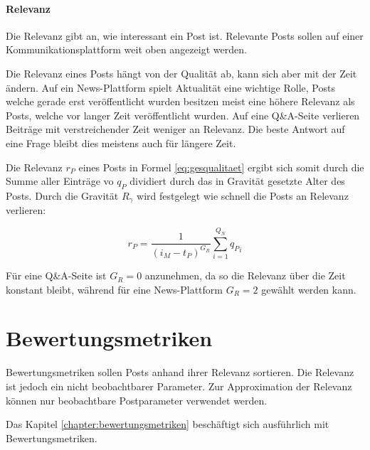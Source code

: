 \paragraph{Relevanz}

Die Relevanz gibt an, wie interessant ein Post ist. Relevante Posts sollen auf einer Kommunikationsplattform weit oben angezeigt werden.

Die Relevanz eines Posts hängt von der Qualität ab, kann sich aber mit der Zeit ändern. Auf ein News-Plattform spielt Aktualität eine wichtige Rolle, Posts welche gerade erst veröffentlicht wurden besitzen meist eine höhere Relevanz als Posts, welche vor langer Zeit veröffentlicht wurden. Auf eine Q\&A-Seite verlieren Beiträge mit verstreichender Zeit weniger an Relevanz. Die beste Antwort auf eine Frage bleibt dies meistens auch für längere Zeit.

Die Relevanz $r_P$ eines Posts in Formel \ref{eq:gesqualitaet} ergibt sich somit durch die Summe aller Einträge vo $q_P$ dividiert durch das in Gravität gesetzte Alter des Posts. Durch die Gravität $R_\gamma$ wird festgelegt wie schnell die Posts an Relevanz verlieren:

\begin{equation}
\label{eq:gesqualitaet}
{r_P} = \frac{1}{(i_M - t_P)^{G_R}}\sum_{i=1}^{Q_N} {q_P}_i
\end{equation}

Für eine Q\&A-Seite ist $G_R = 0$ anzunehmen, da so die Relevanz über die Zeit konstant bleibt, während für eine News-Plattform $G_R = 2$ gewählt werden kann.

\section{Bewertungsmetriken}
\label{sec:bewertungsmetrik}

Bewertungsmetriken sollen Posts anhand ihrer Relevanz sortieren. Die Relevanz ist jedoch ein nicht beobachtbarer Parameter. Zur Approximation der Relevanz können nur beobachtbare Postparameter verwendet werden.

Das Kapitel \ref{chapter:bewertungsmetriken} beschäftigt sich ausführlich mit Bewertungsmetriken.



